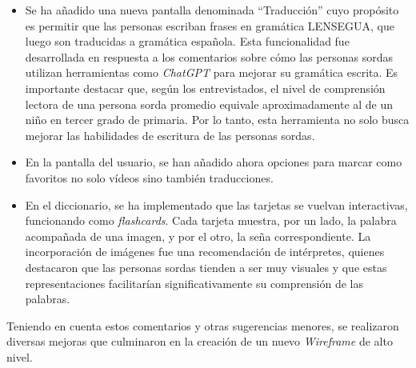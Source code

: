 \begin{itemize}
    \item 
    Se ha añadido una nueva pantalla denominada ``Traducción'' cuyo propósito es permitir que las personas escriban frases en gramática LENSEGUA, que luego son traducidas a gramática española. Esta funcionalidad fue desarrollada en respuesta a los comentarios sobre cómo las personas sordas utilizan herramientas como \textit{ChatGPT} para mejorar su gramática escrita. Es importante destacar que, según los entrevistados, el nivel de comprensión lectora de una persona sorda promedio equivale aproximadamente al de un niño en tercer grado de primaria. Por lo tanto, esta herramienta no solo busca mejorar las habilidades de escritura de las personas sordas. 
    
    \item
    En la pantalla del usuario, se han añadido ahora opciones para marcar como favoritos no solo vídeos sino también traducciones.
    
    \item 
    En el diccionario, se ha implementado que las tarjetas se vuelvan interactivas, funcionando como \textit{flashcards}. Cada tarjeta muestra, por un lado, la palabra acompañada de una imagen, y por el otro, la seña correspondiente. La incorporación de imágenes fue una recomendación de intérpretes, quienes destacaron que las personas sordas tienden a ser muy visuales y que estas representaciones facilitarían significativamente su comprensión de las palabras.
    
\end{itemize}

Teniendo en cuenta estos comentarios y otras sugerencias menores, se realizaron diversas mejoras que culminaron en la creación de un nuevo \textit{Wireframe} de alto nivel.


